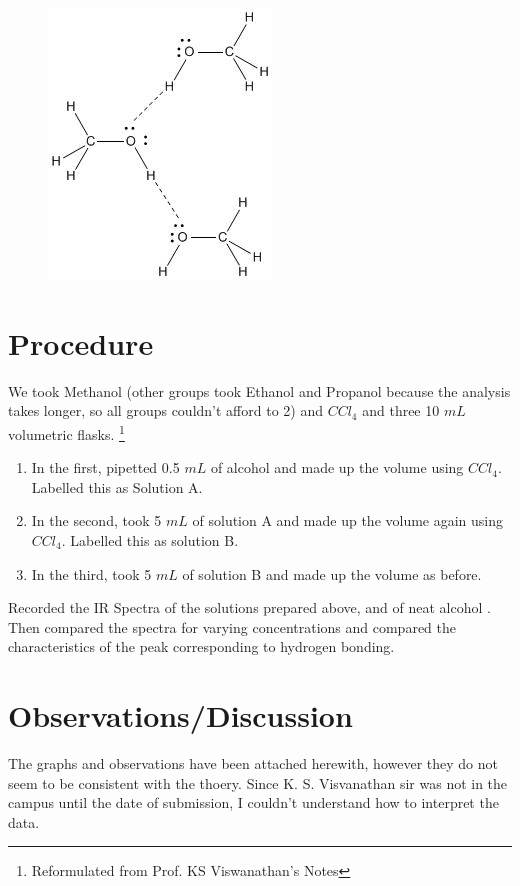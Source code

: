 	\begin{figure}[bth]
		\begin{center}
			\includegraphics[width=0.3\linewidth]{gfx/4B}
		\end{center}
	\caption[Hydrogen Bonds in Methanol]{\label{4B_Bonds}}
	\end{figure}


\section{Procedure}
	We took Methanol (other groups took Ethanol and Propanol because the analysis takes longer, so all groups couldn't afford to 2) and $CCl_{4}$ and three 10 $mL$ volumetric flasks. \footnote{Reformulated from Prof. KS Viswanathan's Notes}
	\begin{enumerate}
		\item In the first, pipetted 0.5 $mL$ of alcohol and made up the volume using $CCl_{4}$. Labelled this as Solution A.
		\item In the second, took 5 $mL$ of solution A and made up the volume again using $CCl_{4}$. Labelled this as solution B.
		\item In the third, took 5 $mL$ of solution B and made up the volume as before.
	\end{enumerate}
	Recorded the IR Spectra of the solutions prepared above, and of neat alcohol {}. Then compared the spectra for varying concentrations and compared the characteristics of the peak corresponding to hydrogen bonding.
\section{Observations/Discussion}
	The graphs and observations have been attached herewith, however they do not seem to be consistent with the thoery. Since K. S. Visvanathan sir was not in the campus until the date of submission, I couldn't understand how to interpret the data.

